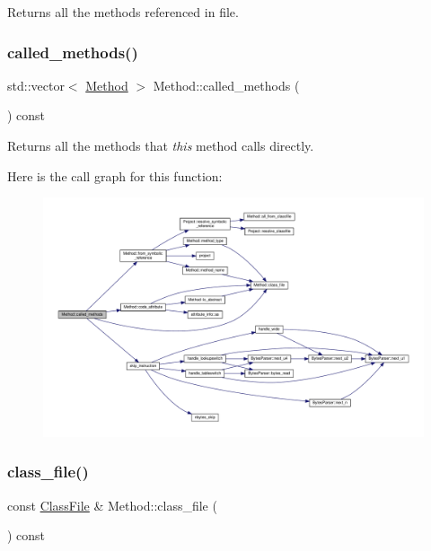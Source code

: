 Returns all the methods referenced in {\ttfamily file}. 

\mbox{\label{classMethod_a378e12e19cf0c8f21bfc13071382d15e}} 
\subsubsection{\texorpdfstring{called\+\_\+methods()}{called\_methods()}}
{\footnotesize\ttfamily std\+::vector$<$ \hyperlink{classMethod}{Method} $>$ Method\+::called\+\_\+methods (\begin{DoxyParamCaption}{ }\end{DoxyParamCaption}) const}



Returns all the methods that {\itshape this} method calls directly. 

Here is the call graph for this function\+:\nopagebreak
\begin{figure}[H]
\begin{center}
\leavevmode
\includegraphics[width=350pt]{classMethod_a378e12e19cf0c8f21bfc13071382d15e_cgraph}
\end{center}
\end{figure}
\mbox{\label{classMethod_ac6eecb9ebb1eb23098c8556752353a81}} 
\subsubsection{\texorpdfstring{class\+\_\+file()}{class\_file()}}
{\footnotesize\ttfamily const \hyperlink{classfile_8h_a00b46b60bc40e813e9fb1bb049174346}{Class\+File} \& Method\+::class\+\_\+file (\begin{DoxyParamCaption}{ }\end{DoxyParamCaption}) const}



